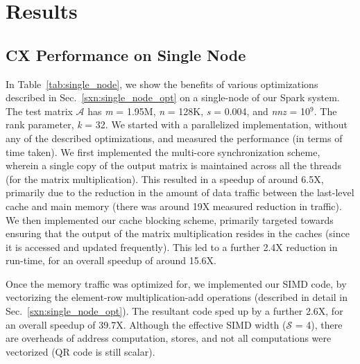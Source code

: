\section{Results}
\label{sec:results}



\subsection{CX Performance on Single Node}
  \label{sxn:results1}


   
  \vspace*{0.1in}

      In Table~\ref{tab:single_node}, we show the benefits of various
      optimizations described in
      Sec.~\ref{sxn:single_node_opt} on a single-node of our Spark system. 
      The test matrix $\mathcal{A}$ has {\it{m}} = 1.95M, {\it{n}} = 128K,
      {\it{s}} = 0.004, and {\it{nnz}} = 10$^9$. The rank parameter,
      {\it{k}} = 32. We started with a parallelized implementation,
      without any of the described optimizations, and measured the
      performance (in terms of time taken). We first implemented the
      multi-core synchronization scheme, wherein a single copy of the
      output matrix is maintained across all the threads (for the matrix multiplication).
      This resulted in a speedup of around 6.5X, primarily due to
      the reduction in the amount of data traffic between the
      last-level cache and main memory (there was around 19X measured reduction
      in traffic). We then implemented our cache blocking scheme,
      primarily targeted towards ensuring that the output of the
      matrix multiplication resides in the caches (since it is
      accessed and updated frequently). This led to a further 2.4X
     reduction in run-time, for an overall speedup of around 15.6X.

     Once the memory traffic was optimized for, we implemented our
     SIMD code, by vectorizing the element-row multiplication-add
     operations (described in detail in Sec.~\ref{sxn:single_node_opt}). 
     The resultant code sped up by a further 2.6X, for an overall
     speedup of 39.7X. Although the effective SIMD width
 ($\mathcal{S}$ = 4), there are overheads of address computation,
 stores, and not all computations were vectorized (QR code is still
 scalar).




